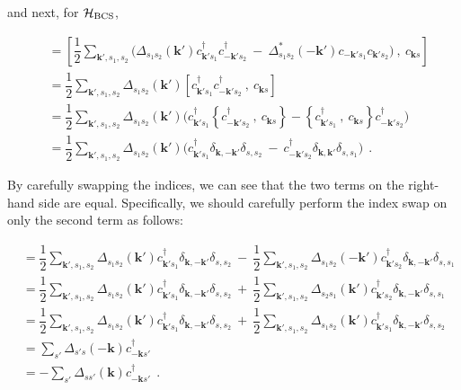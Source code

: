 \documentclass[a4j]{jsarticle}
\begin{document}
and next, for $\mathcal{H}_{\rm BCS}$,

\begin{align}
	[ \mathcal{H}_{\rm BCS} \ , \ c_{\bm{k}s} ]
	 & =
	\left[
		\dfrac{1}{2}
		\sum_{\bm{k}',s_{1},s_{2}}
		\Big(
		\Delta_{ s_{1} s_{2} }( \bm{k}' )
		c_{\bm{k}' s_{1}}^{\dagger}
		c_{-\bm{k}' s_{2}}^{\dagger}
		\ - \
		\Delta_{ s_{1} s_{2} }^{*}( - \bm{k}' )
		c_{-\bm{k}' s_{1}}
		c_{\bm{k}' s_{2}}
		\Big)
		\ , \
		c_{\bm{k}s}
		\right]
	\nonumber \\[2mm] &=
	\dfrac{1}{2}
	\sum_{\bm{k}',s_{1},s_{2}}
	\Delta_{ s_{1} s_{2} }( \bm{k}' )
	\left[
		c_{\bm{k}' s_{1}}^{\dagger}
		c_{-\bm{k}' s_{2}}^{\dagger}
		\ , \
		c_{\bm{k}s}
		\right]
	\nonumber \\[2mm] &=
	\dfrac{1}{2}
	\sum_{\bm{k}',s_{1},s_{2}}
	\Delta_{ s_{1} s_{2} }( \bm{k}' )
	\Big(
	c_{\bm{k}' s_{1}}^{\dagger}
	\left\{
	c_{-\bm{k}' s_{2}}^{\dagger}
	\ , \
	c_{\bm{k}s}
	\right\}
	-
	\left\{
	c_{\bm{k}' s_{1}}^{\dagger}
	\ , \
	c_{\bm{k}s}
	\right\}
	c_{-\bm{k}' s_{2}}^{\dagger}
	\Big)
	\nonumber \\[2mm] &=
	\dfrac{1}{2}
	\sum_{\bm{k}',s_{1},s_{2}}
	\Delta_{ s_{1} s_{2} }( \bm{k}' )
	\Big(
	c_{\bm{k}' s_{1}}^{\dagger}
	\delta_{\bm{k},-\bm{k}'}
	\delta_{s,s_{2}}
	\ - \
	c_{-\bm{k}' s_{2}}^{\dagger}
	\delta_{\bm{k},\bm{k}'}
	\delta_{s,s_{1}}
	\Big)
	\ \ .
\end{align}

By carefully swapping the indices, we can see that the two terms on the right-hand side are equal.
Specifically, we should carefully perform the index swap on only the second term as follows:

\begin{align}
	[ \mathcal{H}_{\rm BCS} \ , \ c_{\bm{k}s} ]
	 & =
	\dfrac{1}{2}
	\sum_{\bm{k}',s_{1},s_{2}}
	\Delta_{ s_{1} s_{2} }( \bm{k}' )
	c_{\bm{k}' s_{1}}^{\dagger}
	\delta_{\bm{k},-\bm{k}'}
	\delta_{s,s_{2}}
	\ - \
	\dfrac{1}{2}
	\sum_{\bm{k}',s_{1},s_{2}}
	\Delta_{ s_{1} s_{2} }( - \bm{k}' )
	c_{\bm{k}' s_{2}}^{\dagger}
	\delta_{\bm{k},-\bm{k}'}
	\delta_{s,s_{1}}
	\nonumber \\[2mm] &=
	\dfrac{1}{2}
	\sum_{\bm{k}',s_{1},s_{2}}
	\Delta_{ s_{1} s_{2} }( \bm{k}' )
	c_{\bm{k}' s_{1}}^{\dagger}
	\delta_{\bm{k},-\bm{k}'}
	\delta_{s,s_{2}}
	\ + \
	\dfrac{1}{2}
	\sum_{\bm{k}',s_{1},s_{2}}
	\Delta_{ s_{2} s_{1} }( \bm{k}' )
	c_{\bm{k}' s_{2}}^{\dagger}
	\delta_{\bm{k},-\bm{k}'}
	\delta_{s,s_{1}}
	\nonumber \\[2mm] &=
	\dfrac{1}{2}
	\sum_{\bm{k}',s_{1},s_{2}}
	\Delta_{ s_{1} s_{2} }( \bm{k}' )
	c_{\bm{k}' s_{1}}^{\dagger}
	\delta_{\bm{k},-\bm{k}'}
	\delta_{s,s_{2}}
	\ + \
	\dfrac{1}{2}
	\sum_{\bm{k}',s_{1},s_{2}}
	\Delta_{ s_{1} s_{2} }( \bm{k}' )
	c_{\bm{k}' s_{1}}^{\dagger}
	\delta_{\bm{k},-\bm{k}'}
	\delta_{s,s_{2}}
	\nonumber \\[2mm] &=
	\sum_{ s' }
	\Delta_{ s' s }( - \bm{k} )
	c_{ - \bm{k} s'}^{\dagger}
	\nonumber \\[2mm] &=
	-
	\sum_{ s' }
	\Delta_{ s s' }( \bm{k} )
	c_{ - \bm{k} s'}^{\dagger}
	\ \ .
\end{align}
\end{document}
